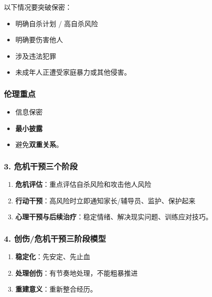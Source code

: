 \documentclass[
  a4paper,
]{ctexart}
\providecommand{\tightlist}{%
  \setlength{\itemsep}{0pt}\setlength{\parskip}{0pt}}
\begin{document}
以下情况要突破保密：

\begin{itemize}
\tightlist
\item
  明确自杀计划 / 高自杀风险
\item
  明确要伤害他人
\item
  涉及违法犯罪
\item
  未成年人正遭受家庭暴力或其他侵害。
\end{itemize}

\subsubsection{伦理重点}\label{ux4f26ux7406ux91cdux70b9}

\begin{itemize}
\tightlist
\item
  信息保密
\item
  \textbf{最小披露}
\item
  避免\textbf{双重关系}。
\end{itemize}

\subsubsection{3.
危机干预三个阶段}\label{ux5371ux673aux5e72ux9884ux4e09ux4e2aux9636ux6bb5}

\begin{enumerate}
\def\labelenumi{\arabic{enumi}.}
\tightlist
\item
  \textbf{危机评估}：重点评估自杀风险和攻击他人风险
\item
  \textbf{行动干预}：高风险时立即通知家长/辅导员、监护、保护起来
\item
  \textbf{心理干预与后续治疗}：稳定情绪、解决现实问题、训练应对技巧。
\end{enumerate}

\subsubsection{4.
创伤/危机干预三阶段模型}\label{ux521bux4f24ux5371ux673aux5e72ux9884ux4e09ux9636ux6bb5ux6a21ux578b}

\begin{enumerate}
\def\labelenumi{\arabic{enumi}.}
\tightlist
\item
  \textbf{稳定化}：先安定、先止血
\item
  \textbf{处理创伤}：有节奏地处理，不能粗暴推进
\item
  \textbf{重建意义}：重新整合经历。
\end{enumerate}
\end{document}

